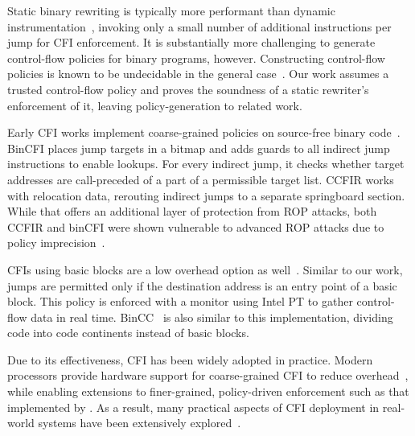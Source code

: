 Static binary rewriting is typically more performant than dynamic instrumentation~\cite{static_cfi_perf,russo2010dynamic}, invoking only a small number of additional instructions per jump for CFI enforcement.
It is substantially more challenging to generate control-flow policies for binary programs, however.
Constructing control-flow policies is known to be undecidable in the general case~\cite{cfi2005ccs}.
Our work assumes a trusted control-flow policy and proves the soundness of a static rewriter's enforcement of it, leaving policy-generation to related work.

Early CFI works implement coarse-grained policies on source-free binary code~\cite{ccfir,bincfi}.
BinCFI places jump targets in a bitmap and adds guards to all indirect jump instructions to enable lookups.
For every indirect jump, it checks whether target addresses are call-preceded of a part of a permissible target list.
CCFIR works with relocation data, rerouting indirect jumps to a separate springboard section.
While that offers an additional layer of protection from ROP attacks, both CCFIR and binCFI were shown vulnerable to advanced ROP attacks due to policy imprecision~\cite{outofcontrol}.

CFIs using basic blocks are a low overhead option as well~\cite{bbb_cfi}.
Similar to our work, jumps are permitted only if the destination address is an entry point of a basic block.
This policy is enforced with a monitor using Intel PT to gather control-flow data in real time.
BinCC~\cite{bincc} is also similar to this implementation, dividing code into code continents instead of basic blocks.

Due to its effectiveness, CFI has been widely adopted in practice. Modern processors provide hardware support for coarse-grained CFI to reduce overhead~\cite{isacfi2019hasp,liljestrand2019pac}, while enabling extensions to finer-grained, policy-driven enforcement such as that implemented by \pname. As a result, many practical aspects of CFI deployment in real-world systems have been extensively explored~\cite{becker2024woot}.

